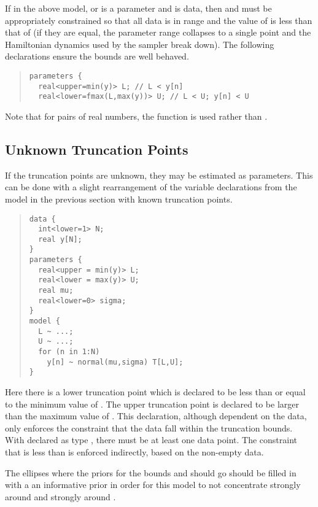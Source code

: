 If in the above model,  or  is a parameter and
 is data, then  and  must be appropriately
constrained so that all data is in range and the value of  is
less than that of  (if they are equal, the parameter range
collapses to a single point and the Hamiltonian dynamics used by 
the sampler break down).  The following declarations ensure the bounds
are well behaved.
%
\begin{quote}
\begin{Verbatim}[fontsize=\small]
parameters {
  real<upper=min(y)> L; // L < y[n]
  real<lower=fmax(L,max(y))> U; // L < U; y[n] < U
\end{Verbatim}
\end{quote}
%
Note that for pairs of real numbers, the function  is used
rather than .







\subsection{Unknown Truncation Points}

If the truncation points are unknown, they may be estimated as
parameters.  This can be done with a slight rearrangement of the
variable declarations from the model in the previous section with
known truncation points.
%
\begin{quote}
\begin{Verbatim}[fontsize=\small]
data {
  int<lower=1> N;
  real y[N];
}
parameters {
  real<upper = min(y)> L; 
  real<lower = max(y)> U;
  real mu;
  real<lower=0> sigma;
}
model {
  L ~ ...;  
  U ~ ...;
  for (n in 1:N)
    y[n] ~ normal(mu,sigma) T[L,U];
}
\end{Verbatim}
\end{quote}
%
Here there is a lower truncation point  which is declared to
be less than or equal to the minimum value of .  The upper
truncation point  is declared to be larger than the maximum
value of .  This declaration, although dependent on the data,
only enforces the constraint that the data fall within the truncation
bounds.  With  declared as type , there must be
at least one data point.  The constraint that  is less than
 is enforced indirectly, based on the non-empty data.

The ellipses where the priors for the bounds  and 
should go should be filled in with a an informative prior in
order for this model to not concentrate  strongly around 
 and  strongly around .


